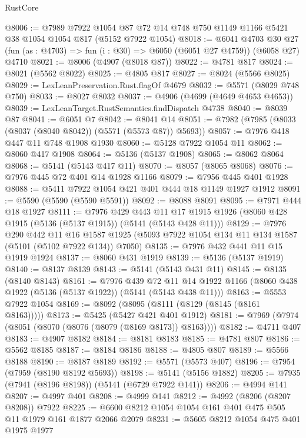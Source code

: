 \begin{lexlean}{RustCore}
\begin{coremodule}
@8006 := @7989
    @7922
    @1054
    @87
    @72
    @14
    @748
    @750
    @1149
    @1166
    @5421
    @38
    @1054
    @1054
    @817
    (@5152 @7922 @1054)
@8018 := @6041
    @4703
    @30
    @27
    (fun (as : @4703) => fun (i : @30) => @6050 (@6051 @27 @4759))
    (@6058 @27)
    @4710
@8021 := @8006 (@4907 (@8018 @87))
@8022 := @4781 @817
@8024 := @8021 (@5562 @8022)
@8025 := @4805 @817
@8027 := @8024 (@5566 @8025)
@8029 := LexLeanPreservation.Rust.flagOf @4679
@8032 := @5571 (@8029 @748 @750)
@8033 := @8027 @8032
@8037 := @4906 (@4699 (@4649 @4653 @4653))
@8039 := LexLeanTarget.RustSemantics.findDispatch @4738
@8040 := @8039 @87
@8041 := @6051 @7
@8042 := @8041 @14
@8051 := @7982 (@7985 (@8033 (@8037 (@8040 @8042)) (@5571 (@5573 @87)) @5693))
@8057 := @7976 @418 @447 @11 @748 @1908 @1930
@8060 := @5128 @7922 @1054 @11
@8062 := @8060 @417 @1908
@8064 := @5136 (@5137 @1908)
@8065 := @8062 @8064
@8068 := @5141 (@5143 @417 @11)
@8070 := @8057 (@8065 @8068)
@8076 := @7976 @445 @72 @401 @14 @1928 @1166
@8079 := @7956 @445 @401 @1928
@8088 := @5411 @7922 @1054 @421 @401 @444 @18 @1149 @1927 @1912
@8091 := @5590 (@5590 (@5590 @5591))
@8092 := @8088 @8091
@8095 := @7971 @444 @18 @1927
@8111 := @7976
    @429
    @443
    @11
    @17
    @1915
    @1926
    (@8060 @428 @1915 (@5136 (@5137 @1915)) (@5141 (@5143 @428 @11)))
@8129 := @7976
    @290
    @442
    @11
    @16
    @1587
    @1925
    (@5093 @7922 @1054 @134 @11 @134 @1587 (@5101 (@5102 @7922 @134)) @7050)
@8135 := @7976 @432 @441 @11 @15 @1919 @1924
@8137 := @8060 @431 @1919
@8139 := @5136 (@5137 @1919)
@8140 := @8137 @8139
@8143 := @5141 (@5143 @431 @11)
@8145 := @8135 (@8140 @8143)
@8161 := @7976
    @439
    @72
    @11
    @14
    @1922
    @1166
    (@8060 @438 @1922 (@5136 (@5137 @1922)) (@5141 (@5143 @438 @11)))
@8163 := @5553 @7922 @1054
@8169 := @8092 (@8095 (@8111 (@8129 (@8145 (@8161 @8163)))))
@8173 := @5425 (@5427 @421 @401 @1912)
@8181 := @7969 (@7974 (@8051 (@8070 (@8076 (@8079 (@8169 @8173)) @8163))))
@8182 := @4711 @407
@8183 := @4907 @8182
@8184 := @8181 @8183
@8185 := @4781 @807
@8186 := @5562 @8185
@8187 := @8184 @8186
@8188 := @4805 @807
@8189 := @5566 @8188
@8190 := @8187 @8189
@8192 := @5571 (@5573 @407)
@8196 := @7954 (@7959 (@8190 @8192 @5693))
@8198 := @5141 (@5156 @1882)
@8205 := @7935 (@7941 (@8196 @8198)) (@5141 (@6729 @7922 @141))
@8206 := @4994 @141
@8207 := @4997 @401
@8208 := @4999 @141
@8212 := @4992 (@8206 (@8207 @8208)) @7922
@8225 := @6600 @8212 @1054 @1054 @161 @401 @475 @505 @11 @1979 @161 @1877 @2066 @2079
@8231 := @5605 @8212 @1054 @475 @401 @1975 @1977

\end{coremodule}
\end{lexlean}

